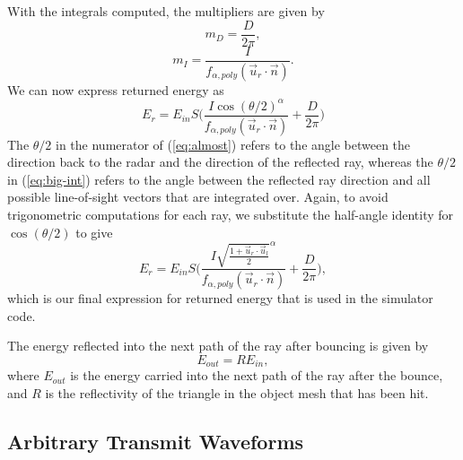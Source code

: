 \documentclass[sensors,article,submit,moreauthors]{Definitions/mdpi}
\begin{document}
With the integrals computed, the multipliers are given by
\begin{equation}
    m_D = \frac{D}{2 \pi}
    ,
\end{equation}
\begin{equation}
    m_I = \frac{I}{f_{\alpha,poly}(\vec{u}_{r} \cdot \vec{n})}
    .
\end{equation}
We can now express returned energy as 
\begin{equation}
    \label{eq:almost}
    E_r = E_{in} S \Bigg(\frac{I
    \cos({\theta/2})^\alpha}{f_{\alpha,poly}(\vec{u}_{r} \cdot \vec{n})} +
    \frac{D}{2\pi}\Bigg)
\end{equation}
The $\theta / 2$ in the numerator of (\ref{eq:almost}) refers to the angle between the direction back to the radar and the direction of the reflected ray, whereas the $\theta / 2$ in (\ref{eq:big-int}) refers to the angle between the reflected ray direction and all possible line-of-sight vectors that are integrated over. Again, to avoid trigonometric computations for each ray, we substitute the half-angle identity for
$\cos(\theta/2)$ to give
\begin{equation}
    \label{eq:returned-energy}
    E_r = E_{in} S \Bigg(\frac{I \sqrt{\frac{1+\vec{u}_r \cdot
    \vec{u}_l}{2}}^\alpha}{f_{\alpha,poly}(\vec{u}_{r} \cdot \vec{n})} +
    \frac{D}{2\pi}\Bigg)
    ,
\end{equation}
which is our final expression for returned energy that is used in the simulator code.

The energy reflected into the next path of the ray after bouncing is given by
\begin{equation}
    E_{out} = RE_{in}
    ,
    \label{eq:reflected-energy}
\end{equation}
where $E_{out}$ is the energy carried into the next path of the ray after the bounce, and $R$ is the reflectivity of the triangle in the object mesh that has been hit.


\subsection{Arbitrary Transmit Waveforms}
\label{sec:waveforms}
\end{document}
